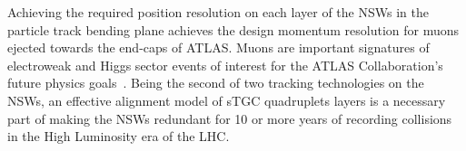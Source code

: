Achieving the required position resolution on each layer of the NSWs in the particle track bending plane achieves the design momentum resolution for muons ejected towards the end-caps of ATLAS. Muons are important signatures of electroweak and Higgs sector events of interest for the ATLAS Collaboration's future physics goals~\cite{nsw_tdr}. Being the second of two tracking technologies on the NSWs, an effective alignment model of sTGC quadruplets layers is a necessary part of making the NSWs redundant for 10 or more years of recording collisions in the High Luminosity era of the LHC. 



